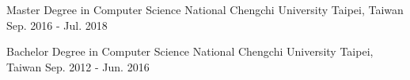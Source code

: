 

\begin{cventries}


	\cventry
	{Master Degree in Computer Science} %
	{National Chengchi University} %
	{Taipei, Taiwan} %
	{Sep. 2016 - Jul. 2018} %
	{
		\begin{cvitems}
		\end{cvitems}
	}

	\cventry
	{Bachelor Degree in Computer Science} %
	{National Chengchi University} %
	{Taipei, Taiwan} %
	{Sep. 2012 - Jun. 2016} %
	{
		\begin{cvitems}
		\end{cvitems}
	}

\end{cventries}
